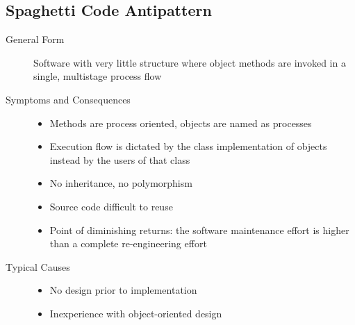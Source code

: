 \subsection{Spaghetti Code Antipattern}
\begin{description}
  \item[General Form] Software with very little structure where object methods are invoked in a single, multistage process flow
  \item[Symptoms and Consequences] \hfill
  \begin{itemize}
    \item Methods are process oriented, objects are named as processes
    \item Execution flow is dictated by the class implementation of objects instead by the users of that class
    \item No inheritance, no polymorphism
    \item Source code difficult to reuse
    \item Point of diminishing returns: the software maintenance effort is higher than a complete re-engineering effort
  \end{itemize}
  \item[Typical Causes] \hfill
  \begin{itemize}
    \item No design prior to implementation
    \item Inexperience with object-oriented design
  \end{itemize}
\end{description}
\newpage

